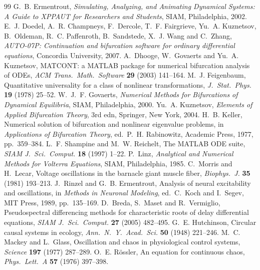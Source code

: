 \documentclass[11pt,a4paper]{article}
\begin{document}
\begin{thebibliography}{99}\small
{} G.~B. Ermentrout, \emph{Simulating, Analyzing, and Animating Dynamical Systems: A Guide to XPPAUT for Researchers and Students}, SIAM, Philadelphia, 2002.
 E.~J. Doedel, A.~R. Champneys, F.~Dercole, T.~F. Fairgrieve, Yu.~A. Kuznetsov, B.~Oldeman, R.~C. Paffenroth, B.~Sandstede, X.~J. Wang and C.~Zhang, \emph{AUTO-07P: Continuation and bifurcation software for ordinary differential equations}, Concordia University, 2007.
 A.~Dhooge, W.~Govaerts and Yu.~A. Kuznetsov, MATCONT: a MATLAB package for numerical bifurcation analysis of ODEs, \emph{ACM Trans.\ Math.\ Software} \textbf{29} (2003) 141--164.
 M.~J. Feigenbaum, Quantitative universality for a class of nonlinear transformations, \emph{J.\ Stat.\ Phys.} \textbf{19} (1978) 25--52.
 W.~J.~F. Govaerts, \emph{Numerical Methods for Bifurcations of Dynamical Equilibria}, SIAM, Philadelphia, 2000.
 Yu.~A. Kuznetsov, \emph{Elements of Applied Bifurcation Theory}, 3rd edn, Springer, New York, 2004.
 H.~B. Keller, Numerical solution of bifurcation and nonlinear eigenvalue problems, in \emph{Applications of Bifurcation Theory}, ed.\ P.~H. Rabinowitz, Academic Press, 1977, pp.~359--384.
 L.~F. Shampine and M.~W. Reichelt, The MATLAB ODE suite, \emph{SIAM J.\ Sci.\ Comput.} \textbf{18} (1997) 1--22.
 P.~Linz, \emph{Analytical and Numerical Methods for Volterra Equations}, SIAM, Philadelphia, 1985.
 C.~Morris and H.~Lecar, Voltage oscillations in the barnacle giant muscle fiber, \emph{Biophys.\ J.} \textbf{35} (1981) 193--213.
 J.~Rinzel and G.~B. Ermentrout, Analysis of neural excitability and oscillations, in \emph{Methods in Neuronal Modeling}, ed.\ C.~Koch and I.~Segev, MIT Press, 1989, pp.~135--169.
 D.~Breda, S.~Maset and R.~Vermiglio, Pseudospectral differencing methods for characteristic roots of delay differential equations, \emph{SIAM J.\ Sci.\ Comput.} \textbf{27} (2005) 482--495.
 G.~E. Hutchinson, Circular causal systems in ecology, \emph{Ann.\ N.\ Y.\ Acad.\ Sci.} \textbf{50} (1948) 221--246.
 M.~C. Mackey and L.~Glass, Oscillation and chaos in physiological control systems, \emph{Science} \textbf{197} (1977) 287--289.
 O.~E. Rössler, An equation for continuous chaos, \emph{Phys.\ Lett.\ A} \textbf{57} (1976) 397--398.

\end{thebibliography}
\end{document}
